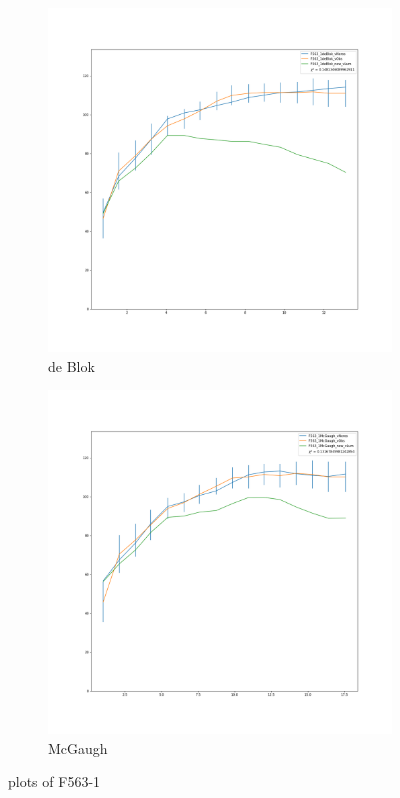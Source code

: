 \documentclass[reprint,%
 amsmath,amssymb,
 aps,
]{revtex4-1}
\begin{document}
 \begin{figure}[h]
\begin{subfigure}{.5\textwidth}
  \centering
  \includegraphics[width=.8\linewidth]{F563_1deBlok_XueSofue.png}
  \caption{de Blok}
  \label{fig:sfig23}
\end{subfigure}%
\begin{subfigure}{.5\textwidth}
  \centering
  \includegraphics[width=.8\linewidth]{F563_1McGaugh_XueSofue.png}
  \caption{McGaugh}
  \label{fig:sfig24}
\end{subfigure}
\caption{plots of F563-1}
\label{fig:figF563-1}
\end{figure}
\clearpage
  
\end{document}

